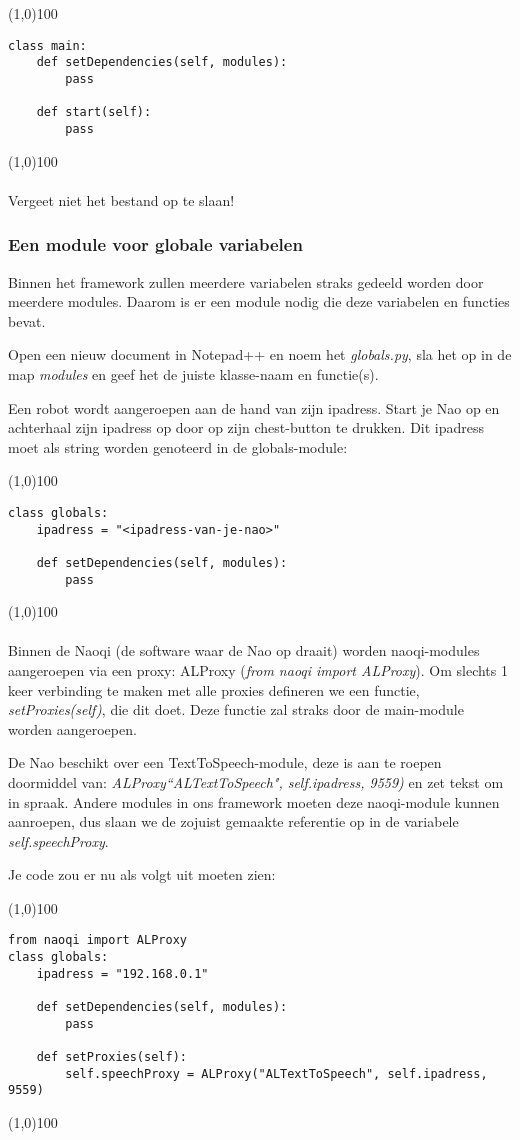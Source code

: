 \documentclass[a4paper]{article}
\begin{document}
\noindent \line(1,0){100}
\begin{verbatim}
class main:
    def setDependencies(self, modules):
        pass

    def start(self):
        pass
\end{verbatim}
\noindent \line(1,0){100}
\\\\
Vergeet niet het bestand op te slaan!

\subsubsection{Een module voor globale variabelen}
Binnen het framework zullen meerdere variabelen straks gedeeld worden door meerdere modules. Daarom is er een module nodig die deze variabelen en functies bevat.

Open een nieuw document in Notepad++ en noem het \textit{globals.py}, sla het op in de map \textit{modules} en geef het de juiste klasse-naam en functie(s). 

Een robot wordt aangeroepen aan de hand van zijn ipadress. Start je Nao op en achterhaal zijn ipadress op door op zijn chest-button te drukken. Dit ipadress moet als string worden genoteerd in de globals-module:

\noindent \line(1,0){100}
\begin{verbatim}
class globals:
    ipadress = "<ipadress-van-je-nao>"

    def setDependencies(self, modules):
        pass
\end{verbatim}
\noindent \line(1,0){100}
\\\\
Binnen de Naoqi (de software waar de Nao op draait) worden naoqi-modules aangeroepen via een proxy: ALProxy (\textit{from naoqi import ALProxy}). Om slechts 1 keer verbinding te maken met alle proxies defineren we een functie, \textit{setProxies(self)}, die dit doet. Deze functie zal straks door de main-module worden aangeroepen.

De Nao beschikt over een TextToSpeech-module, deze is aan te roepen doormiddel van: \textit{ALProxy``ALTextToSpeech", self.ipadress, 9559)}
en zet tekst om in spraak. Andere modules in ons framework moeten deze naoqi-module kunnen aanroepen, dus slaan we de zojuist gemaakte referentie op in de variabele \textit{self.speechProxy}.

Je code zou er nu als volgt uit moeten zien:

\noindent \line(1,0){100}
\begin{verbatim}
from naoqi import ALProxy
class globals:
    ipadress = "192.168.0.1"

    def setDependencies(self, modules):
        pass

    def setProxies(self):
        self.speechProxy = ALProxy("ALTextToSpeech", self.ipadress, 9559)
\end{verbatim}
\noindent \line(1,0){100}
\end{document}
